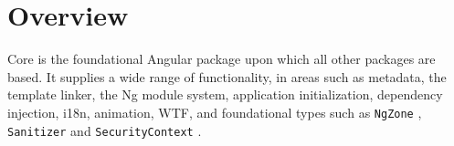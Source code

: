 \section{Overview}

Core is the foundational Angular package upon which all other packages are based. It
supplies a wide range of functionality, in areas such as metadata, the template linker,
the Ng module system, application initialization, dependency injection, i18n,
animation, WTF, and foundational types such as
\texttt{NgZone}
,
\texttt{Sanitizer}
and
\texttt{SecurityContext}
.
